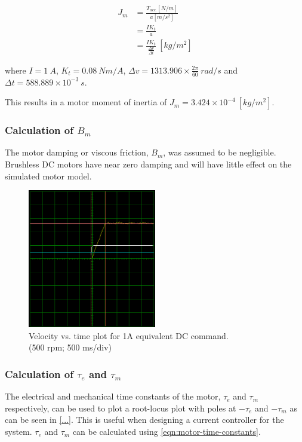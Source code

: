 \begin{equation} \label{eqn:Jm}
\begin{aligned}
J_m &= \frac{T_{acc.}[N/m]}{a[m/s^2]} \\
&= \frac{IK_t}{a} \\
&= \frac{IK_t}{\frac{\Delta v}{\Delta t}}\ [kg/m^2]
\end{aligned}
\end{equation}

where $I=1\ A$, $K_t=0.08\ Nm/A$, $\Delta v = 1313.906\times \frac{2\pi}{60}\ rad/s$ and $\Delta t = 588.889\times10^{-3}\ s$.

This results in a motor moment of inertia of $J_m = 3.424 \times 10^{-4}\ [kg/m^2]$.

\subsubsection{Calculation of $B_m$}

The motor damping or viscous friction, $B_m$, was assumed to be negligible. Brushless DC motors have near zero damping and will have little effect on the simulated motor model.

\begin{figure}
\centering
\includegraphics[width=0.5\textwidth]{images/driveware/current-velocity-response} 
\caption{Velocity vs. time plot for 1A equivalent DC command.\\
(500 rpm; 500 ms/div)}
\label{fig:jm-plots}
\end{figure}

\subsubsection{Calculation of $\tau_e$ and $\tau_m$}
The electrical and mechanical time constants of the motor, $\tau_e$ and $\tau_m$ respectively, can be used to plot a root-locus plot with poles at $-\tau_e$ and $-\tau_m$ as can be seen in \cref{...}. This is useful when designing a current controller for the system. $\tau_e$ and $\tau_m$ can be calculated using \cref{eqn:motor-time-constants}.

